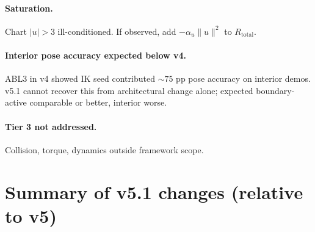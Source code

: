 \documentclass[11pt,a4paper]{article}
\begin{document}
\paragraph{Saturation.} Chart $|u| > 3$ ill-conditioned. If observed, add $-\alpha_u \|u\|^2$ to $R_\text{total}$.

\paragraph{Interior pose accuracy expected below v4.} ABL3 in v4 showed IK seed contributed $\sim 75$ pp pose accuracy on interior demos. v5.1 cannot recover this from architectural change alone; expected boundary-active comparable or better, interior worse.

\paragraph{Tier 3 not addressed.} Collision, torque, dynamics outside framework scope.

\section{Summary of v5.1 changes (relative to v5)}
\end{document}
